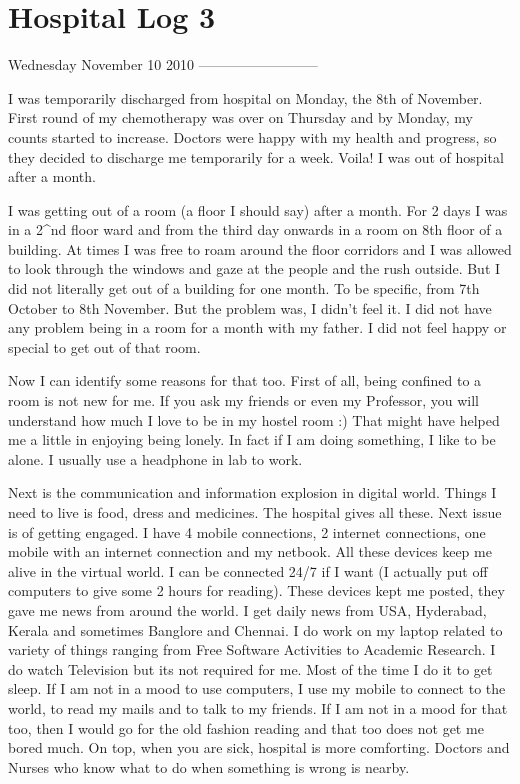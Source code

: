 \section*{Hospital Log 3}
\vskip 2pt

Wednesday November 10 2010 
--------------------------

I was temporarily discharged from hospital on Monday, the 8th of November. First round of my chemotherapy was over on Thursday and by Monday, my counts started to increase. Doctors were happy with my health and progress, so they decided to discharge me temporarily for a week. Voila! I was out of hospital after a month. 

I was getting out of a room (a floor I should say) after a month. For 2 days I was in a 2^{nd} floor ward and from the third day onwards in a room on 8th floor of a building. At times I was free to roam around the floor corridors and I was allowed to look through the windows and gaze at the people and the rush outside. But I did not literally get out of a building for one month. To be specific, from 7th October to 8th November. But the problem was, I didn't feel it. I did not have any problem being in a room for a month with my father. I did not feel happy or special to get out of that room. 

Now I can identify some reasons for that too. First of all, being confined to a room is not new for me. If you ask my friends or even my Professor, you will understand how much I love to be in my hostel room :) That might have helped me a little in enjoying being lonely. In fact if I am doing something, I like to be alone. I usually use a headphone in lab to work.  

Next is the communication and information explosion in digital world. Things I need to live is food, dress and medicines. The hospital gives all these. Next issue is of getting engaged. I have 4 mobile connections, 2 internet connections, one mobile with an internet connection and my netbook. All these devices keep me alive in the virtual world. I can be connected 24/7 if I want (I actually put off computers to give some 2 hours for reading). These devices kept me posted, they gave me news from around the world. I get daily news from USA, Hyderabad, Kerala and sometimes Banglore and Chennai. I do work on my laptop related to variety of things ranging from Free Software Activities to Academic Research. I do watch Television but its not required for me. Most of the time I do it to get sleep. If I am not in a mood to use computers, I use my mobile to connect to the world, to read my mails and to talk to my friends. If I am not in a mood for that too, then I would go for the old fashion reading and that too does not get me bored much. On top, when you are sick, hospital is more comforting. Doctors and Nurses who know what to do when something is wrong is nearby.

